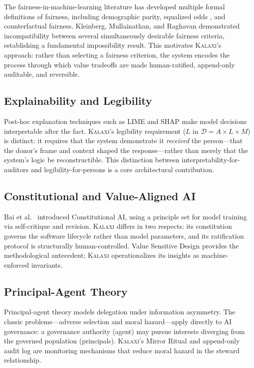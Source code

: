 \documentclass[12pt,a4paper]{article}
\theoremstyle{definition}
\theoremstyle{remark}
\newcommand{\kalaxi}{\textsc{Kalaxi}}
\newcommand{\D}{\mathcal{D}}
\begin{document}
The fairness-in-machine-learning literature has developed multiple formal definitions
of fairness, including demographic parity, equalized odds \cite{hardt2016}, and
counterfactual fairness. Kleinberg, Mullainathan, and Raghavan \cite{kleinberg2017}
demonstrated incompatibility between several simultaneously desirable fairness criteria,
establishing a fundamental impossibility result. This motivates \kalaxi{}'s approach:
rather than selecting a fairness criterion, the system encodes the process through which
value tradeoffs are made human-ratified, append-only auditable, and reversible.

\subsection{Explainability and Legibility}

Post-hoc explanation techniques such as LIME \cite{ribeiro2016} and SHAP
\cite{lundberg2017} make model decisions interpretable after the fact. \kalaxi{}'s
legibility requirement ($L$ in $\D = A \times L \times M$) is distinct: it requires
that the system demonstrate it \emph{received} the person—that the donor's frame and
context shaped the response—rather than merely that the system's logic be
reconstructible. This distinction between interpretability-for-auditors and
legibility-for-persons is a core architectural contribution.

\subsection{Constitutional and Value-Aligned AI}

Bai et al.\ \cite{bai2022} introduced Constitutional AI, using a principle set for
model training via self-critique and revision. \kalaxi{} differs in two respects:
its constitution governs the software lifecycle rather than model parameters, and its
ratification protocol is structurally human-controlled. Value Sensitive Design
\cite{friedman2006,friedman2019} provides the methodological antecedent; \kalaxi{}
operationalizes its insights as machine-enforced invariants.

\subsection{Principal-Agent Theory}

Principal-agent theory \cite{holmstrom1979} models delegation under information
asymmetry. The classic problems—adverse selection and moral hazard—apply directly to
AI governance: a governance authority (agent) may pursue interests diverging from the
governed population (principals). \kalaxi{}'s Mirror Ritual and append-only audit log
are monitoring mechanisms that reduce moral hazard in the steward relationship.
\end{document}
